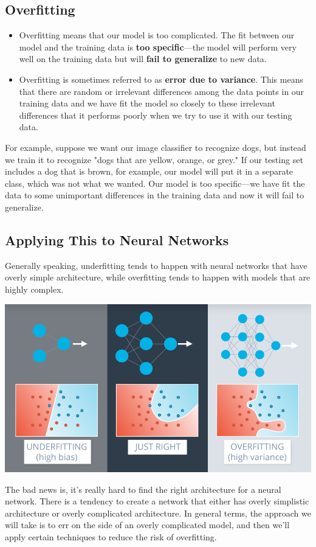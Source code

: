 \subsection{Overfitting}

\begin{itemize}
    \item Overfitting means that our model is too complicated. The fit between our model and the training data is \textbf{too specific}—the model will perform very well on the training data but will \textbf{fail to generalize} to new data.
    \item Overfitting is sometimes referred to as \textbf{error due to variance}. This means that there are random or irrelevant differences among the data points in our training data and we have fit the model so closely to these irrelevant differences that it performs poorly when we try to use it with our testing data.
\end{itemize}
For example, suppose we want our image classifier to recognize dogs, but instead we train it to recognize "dogs that are yellow, orange, or grey." If our testing set includes a dog that is brown, for example, our model will put it in a separate class, which was not what we wanted. Our model is too specific—we have fit the data to some unimportant differences in the training data and now it will fail to generalize.

\subsection{Applying This to Neural Networks}

Generally speaking, underfitting tends to happen with neural networks that have overly simple architecture, while overfitting tends to happen with models that are highly complex.

\includegraphics[width=0.75\linewidth]{img//intro//trainingNN/training-considerations-3.png}

The bad news is, it's really hard to find the right architecture for a neural network. There is a tendency to create a network that either has overly simplistic architecture or overly complicated architecture. In general terms, the approach we will take is to err on the side of an overly complicated model, and then we'll apply certain techniques to reduce the risk of overfitting.

